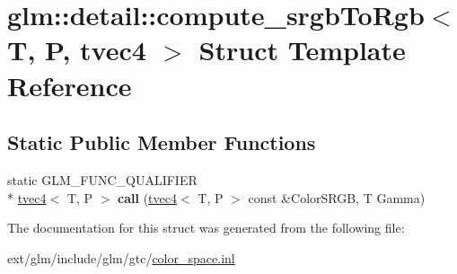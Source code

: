 \hypertarget{structglm_1_1detail_1_1compute__srgb_to_rgb_3_01_t_00_01_p_00_01tvec4_01_4}{\section{glm\-:\-:detail\-:\-:compute\-\_\-srgb\-To\-Rgb$<$ T, P, tvec4 $>$ Struct Template Reference}
\label{structglm_1_1detail_1_1compute__srgb_to_rgb_3_01_t_00_01_p_00_01tvec4_01_4}
}
\subsection*{Static Public Member Functions}
\begin{DoxyCompactItemize}
\item 
\hypertarget{structglm_1_1detail_1_1compute__srgb_to_rgb_3_01_t_00_01_p_00_01tvec4_01_4_a09238f9fb7bdd410512b3daf66ecabbc}{static G\-L\-M\-\_\-\-F\-U\-N\-C\-\_\-\-Q\-U\-A\-L\-I\-F\-I\-E\-R \\*
\hyperlink{structglm_1_1tvec4}{tvec4}$<$ T, P $>$ {\bfseries call} (\hyperlink{structglm_1_1tvec4}{tvec4}$<$ T, P $>$ const \&Color\-S\-R\-G\-B, T Gamma)}\label{structglm_1_1detail_1_1compute__srgb_to_rgb_3_01_t_00_01_p_00_01tvec4_01_4_a09238f9fb7bdd410512b3daf66ecabbc}

\end{DoxyCompactItemize}


The documentation for this struct was generated from the following file\-:\begin{DoxyCompactItemize}
\item 
ext/glm/include/glm/gtc/\hyperlink{gtc_2color__space_8inl}{color\-\_\-space.\-inl}\end{DoxyCompactItemize}
